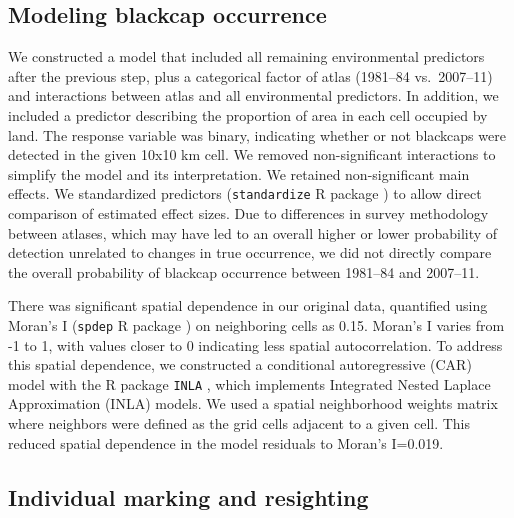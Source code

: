 \documentclass[a4paper, twoside]{templates/ociamthesis}
\begin{document}
\hypertarget{modeling-blackcap-occurrence}{%
\subsection{Modeling blackcap occurrence}\label{modeling-blackcap-occurrence}}

We constructed a model that included all remaining environmental predictors after the previous step, plus a categorical factor of atlas (1981--84 vs.~2007--11) and interactions between atlas and all environmental predictors. In addition, we included a predictor describing the proportion of area in each cell occupied by land.
The response variable was binary, indicating whether or not blackcaps were detected in the given 10x10 km cell. We removed non-significant interactions to simplify the model and its interpretation. We retained non-significant main effects. We standardized predictors (\texttt{standardize} R package \autocite{eagerStandardizeToolsStandardizing2017}) to allow direct comparison of estimated effect sizes. Due to differences in survey methodology between atlases, which may have led to an overall higher or lower probability of detection unrelated to changes in true occurrence, we did not directly compare the overall probability of blackcap occurrence between 1981--84 and 2007--11.

There was significant spatial dependence in our original data, quantified using Moran's I (\texttt{spdep} R package \autocite{bivandAppliedSpatialData2013}) on neighboring cells as 0.15. Moran's I varies from -1 to 1, with values closer to 0 indicating less spatial autocorrelation. To address this spatial dependence, we constructed a conditional autoregressive (CAR) model with the R package \texttt{INLA} \autocite{lindgrenBayesianSpatialModelling2015}, which implements Integrated Nested Laplace Approximation (INLA) models. We used a spatial neighborhood weights matrix where neighbors were defined as the grid cells adjacent to a given cell. This reduced spatial dependence in the model residuals to Moran's I=0.019.

\hypertarget{individual-marking-and-resighting}{%
\subsection{Individual marking and resighting}\label{individual-marking-and-resighting}}
\end{document}
